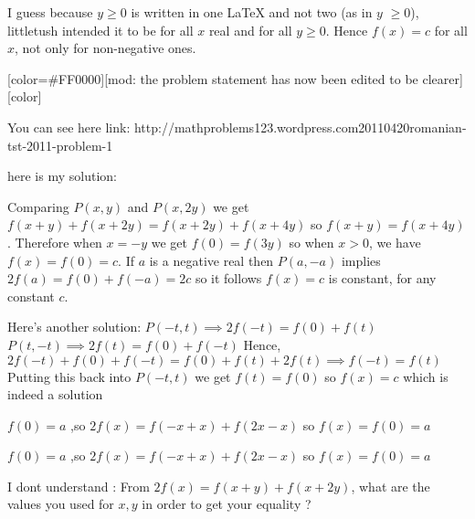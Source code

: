\begin{solution}
	I guess because $y \ge 0$ is written in one LaTeX and not two (as in $y$ $\ge 0$), littletush intended it to be for all $x$ real and for all $y \ge 0$. Hence $f(x) = c$ for all $x$, not only for non-negative ones.

[color=#FF0000][mod: the problem statement has now been edited to be clearer][\/color]
\end{solution}



\begin{solution}
	You can see here link: http://mathproblems123.wordpress.com\/2011\/04\/20\/romanian-tst-2011-problem-1\/
\end{solution}



\begin{solution}
	here is my solution:

Comparing $P(x,y)$ and $P(x,2y)$ we get $f(x+y)+f(x+2y)=f(x+2y)+f(x+4y)$ so $f(x+y)=f(x+4y)$. Therefore when $x=-y$ we get $f(0)=f(3y)$ so when $x>0$, we have $f(x)=f(0)=c$. If $a$ is a negative real then $P(a,-a)$ implies $2f(a)=f(0)+f(-a)=2c$ so it follows $f(x)=c$ is constant, for any constant $c$.
\end{solution}



\begin{solution}
	Here's another solution:
$P(-t,t) \implies 2f(-t)=f(0)+f(t)$
$P(t,-t) \implies 2f(t)=f(0)+f(-t)$
Hence, $2f(-t)+f(0)+f(-t)=f(0)+f(t)+ 2f(t) \implies f(-t)=f(t)$
Putting this back into $P(-t,t)$ we get $f(t)=f(0)$ so
$ \boxed{f(x)=c} $ which is indeed a solution
\end{solution}



\begin{solution}
	$f(0)=a$ ,so $2f(x)=f(-x+x)+f(2x-x)$ so $f(x)=f(0)=a$
\end{solution}



\begin{solution}
	\begin{tcolorbox}$f(0)=a$ ,so $2f(x)=f(-x+x)+f(2x-x)$ so $f(x)=f(0)=a$\end{tcolorbox}
I dont understand :
From $2f(x)=f(x+y)+f(x+2y)$, what are the values you used for $x,y$ in order to get your equality ?
\end{solution}



